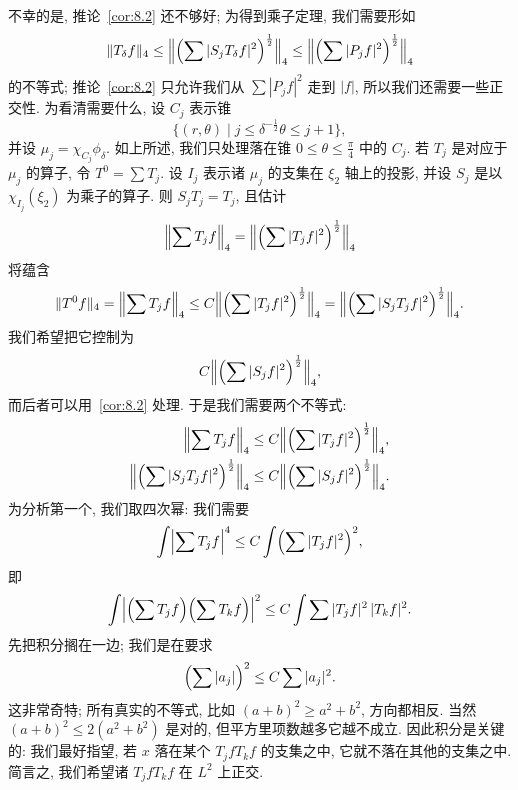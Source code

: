 不幸的是, 推论~\ref{cor:8.2} 还不够好; 为得到乘子定理, 我们需要形如
\[
\|T_{\delta}f\|_{4}\leq\Bigl\|\Bigl(\sum|S_{j}T_{\delta}f|^{2}\Bigr)^{\frac{1}{2}}\Bigr\|_{4}
\leq\Bigl\|\Bigl(\sum|P_{j}f|^{2}\Bigr)^{\frac{1}{2}}\Bigr\|_{4}
\]
的不等式; 推论~\ref{cor:8.2} 只允许我们从 $\sum|P_jf|^2$ 走到 $|f|$, 所以我们还需要一些正交性. 为看清需要什么, 设 $C_j$ 表示锥
\[
\{(r,\theta) \mid j\leq\delta^{-\frac{1}{2}}\theta\leq j+1\},
\]
并设 $\mu_j=\chi_{C_j}\phi_\delta$. 如上所述, 我们只处理落在锥 $0\leq\theta\leq\frac{\pi}{4}$ 中的 $C_j$. 若 $T_j$ 是对应于 $\mu_j$ 的算子, 令 $T^0=\sum T_j$. 设 $I_j$ 表示诸 $\mu_j$ 的支集在 $\xi_2$ 轴上的投影, 并设 $S_j$ 是以 $\chi_{I_j}(\xi_2)$ 为乘子的算子. 则 $S_jT_j=T_j$, 且估计
\[
\Bigl\|\sum T_{j}f\Bigr\|_{4}=\Bigl\|\Bigl(\sum|T_{j}f|^{2}\Bigr)^{\frac{1}{2}}\Bigr\|_{4}
\]
将蕴含
\[
\|T^{0}f\|_{4}=\Bigl\|\sum T_{j}f\Bigr\|_{4}
\leq C\Bigl\|\Bigl(\sum|T_{j}f|^{2}\Bigr)^{\frac{1}{2}}\Bigr\|_{4}
=\Bigl\|\Bigl(\sum|S_{j}T_{j}f|^{2}\Bigr)^{\frac{1}{2}}\Bigr\|_{4}.
\]
我们希望把它控制为
\[
C\Bigl\|\Bigl(\sum|S_{j}f|^{2}\Bigr)^{\frac{1}{2}}\Bigr\|_{4},
\]
而后者可以用~\ref*{cor:8.2} 处理. 于是我们需要两个不等式:
\begin{align*}
\Bigl\|\sum T_{j}f\Bigr\|_{4}&\leq C\Bigl\|\Bigl(\sum|T_{j}f|^{2}\Bigr)^{\frac{1}{2}}\Bigr\|_{4}, \\
\Bigl\|\Bigl(\sum|S_{j}T_{j}f|^{2}\Bigr)^{\frac{1}{2}}\Bigr\|_{4}
&\leq C\Bigl\|\Bigl(\sum|S_{j}f|^{2}\Bigr)^{\frac{1}{2}}\Bigr\|_{4}.
\end{align*}
为分析第一个, 我们取四次幂: 我们需要
\[
\int\Bigl|\sum T_{j}f\Bigr|^{4}\leq C\int\Bigl(\sum|T_{j}f|^{2}\Bigr)^{2},
\]
即
\[
\int\Bigl|\Bigl(\sum T_{j}f\Bigr)\Bigl(\sum T_{k}f\Bigr)\Bigr|^{2}
\leq C\int\sum|T_{j}f|^{2}\,|T_{k}f|^{2}.
\]
先把积分搁在一边; 我们是在要求
\[
\Bigl(\sum|a_{j}|\Bigr)^{2}\leq C\sum|a_{j}|^{2}.
\]
这非常奇特; 所有真实的不等式, 比如 $(a+b)^2\geq a^2+b^2$, 方向都相反. 当然 $(a+b)^2\leq 2(a^2+b^2)$ 是对的, 但平方里项数越多它越不成立. 因此积分是关键的: 我们最好指望, 若 $x$ 落在某个 $T_jfT_kf$ 的支集之中, 它就不落在其他的支集之中. 简言之, 我们希望诸 $T_jfT_kf$ 在 $L^2$ 上正交.

